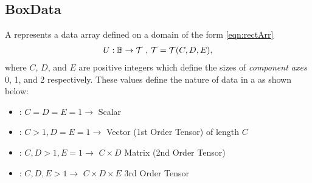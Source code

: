 \documentclass[12pt]{article}
\begin{document}
%
%
%
%
%
%
%
%
%

\subsection{BoxData}

A  represents a data array defined on a  domain of the form \eqref{eqn:rectArr}
\begin{gather*}
U:\mathbb{B} \rightarrow \mathcal{T} \hbox{ , } \mathcal{T} = \mathcal{T}(C,D,E),
\end{gather*}
where $C$, $D$, and $E$ are positive integers which define the sizes of \textit{component axes} 0, 1, and 2 respectively. These values define the nature of data in a  as shown below:

\begin{itemize}
\item: $C=D=E=1\rightarrow$ Scalar
\item: $C>1, D=E=1\rightarrow$ Vector (1st Order Tensor) of length $C$
\item: $C,D>1, E=1\rightarrow$ $C\times D$ Matrix (2nd Order Tensor)
\item: $C,D,E>1\rightarrow$ $C\times D\times E$ 3rd Order Tensor
\end{itemize}
\end{document}
